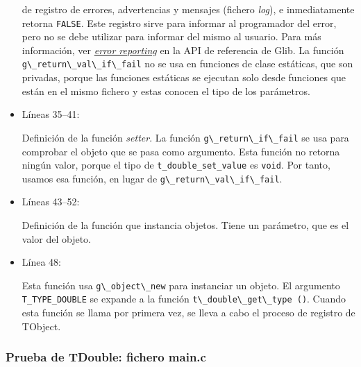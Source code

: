 \begin{itemize}
  de registro de errores, advertencias y mensajes (fichero \textit{log}), e inmediatamente retorna \texttt{FALSE}.
  Este registro sirve para informar al programador del error, pero no se debe utilizar para informar del
  mismo al usuario. Para más información, ver \href{https://docs.gtk.org/glib/error-reporting.html}
  {\textit{error reporting}} en la API de referencia de Glib.
  {\color{red}
  La función \passthrough{\lstinline!g\_return\_val\_if\_fail!} no se usa en funciones de clase estáticas, que son
  privadas, porque las funciones estáticas se ejecutan solo desde funciones que están en el mismo fichero y estas
  conocen el tipo de los parámetros\footnotemark{}.}
\item Líneas 35--41:\par
  Definición de la función \textit{setter}. La función \passthrough{\lstinline!g\_return\_if\_fail!} se usa
  para comprobar el objeto que se pasa como argumento. Esta función no retorna ningún valor, porque
  el tipo de \texttt{t\_double\_set\_value} es \texttt{void}. Por tanto, usamos esa función, en lugar de
  \passthrough{\lstinline!g\_return\_val\_if\_fail!}.
\item Líneas 43--52:\par
  Definición de la función que instancia objetos. Tiene un parámetro, que es el valor del objeto.
\item Línea 48:\par
  Esta función usa \passthrough{\lstinline!g\_object\_new!} para instanciar un objeto. El argumento
  \texttt{T\_TYPE\_DOUBLE} se expande a la función \passthrough{\lstinline!t\_double\_get\_type ()!}.
  Cuando esta función se llama por primera vez, se lleva a cabo el proceso de registro de \textsf{TObject}.
\end{itemize}

\subsubsection{Prueba de \textsf{TDouble}: fichero \textsf{main.c}}


